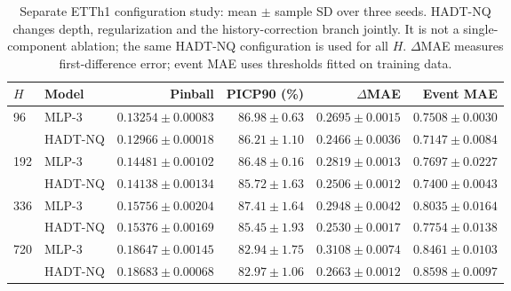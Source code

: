 \begin{table}[t]
\centering\small
\caption{Separate ETTh1 configuration study: mean $\pm$ sample SD over three seeds. HADT-NQ changes depth, regularization and the history-correction branch jointly. It is not a single-component ablation; the same HADT-NQ configuration is used for all $H$. $\Delta$MAE measures first-difference error; event MAE uses thresholds fitted on training data.}
\label{tab:refinement}
\begin{tabular}{@{}llrrrr@{}}
\toprule
$H$ & Model & Pinball & PICP90 (\%) & $\Delta$MAE & Event MAE \\
\midrule
96 & MLP-3 & $0.13254\pm0.00083$ & $86.98\pm0.63$ & $0.2695\pm0.0015$ & $0.7508\pm0.0030$ \\
 & HADT-NQ & $0.12966\pm0.00018$ & $86.21\pm1.10$ & $0.2466\pm0.0036$ & $0.7147\pm0.0084$ \\
\midrule
192 & MLP-3 & $0.14481\pm0.00102$ & $86.48\pm0.16$ & $0.2819\pm0.0013$ & $0.7697\pm0.0227$ \\
 & HADT-NQ & $0.14138\pm0.00134$ & $85.72\pm1.63$ & $0.2506\pm0.0012$ & $0.7400\pm0.0043$ \\
\midrule
336 & MLP-3 & $0.15756\pm0.00204$ & $87.41\pm1.64$ & $0.2948\pm0.0042$ & $0.8035\pm0.0164$ \\
 & HADT-NQ & $0.15376\pm0.00169$ & $85.45\pm1.93$ & $0.2530\pm0.0017$ & $0.7754\pm0.0138$ \\
\midrule
720 & MLP-3 & $0.18647\pm0.00145$ & $82.94\pm1.75$ & $0.3108\pm0.0074$ & $0.8461\pm0.0103$ \\
 & HADT-NQ & $0.18683\pm0.00068$ & $82.97\pm1.06$ & $0.2663\pm0.0012$ & $0.8598\pm0.0097$ \\
\bottomrule
\end{tabular}
\end{table}
